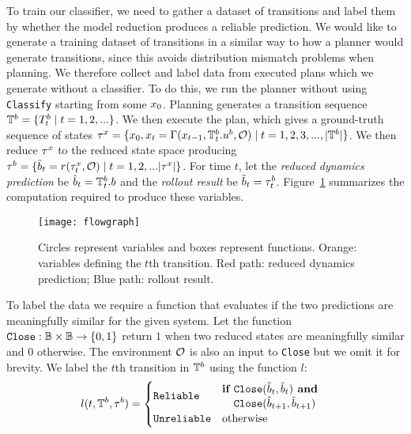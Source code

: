 To train our classifier, we need to gather a dataset of transitions and label them by whether the model reduction produces a reliable prediction. We would like to generate a training dataset of transitions in a similar way to how a planner would generate transitions, since this avoids distribution mismatch problems when planning. We therefore collect and label data from executed plans which we generate without a classifier. To do this, we run the planner without using \texttt{Classify} starting from some $x_0$. Planning generates a transition sequence $\mathbb{T}^b = \{T_t^b \mid t=1,2,...\}$. We then execute the plan, which gives a ground-truth sequence of states $\tau^x = \{x_0, x_t = \Gamma(x_{t-1},\mathbb{T}^b_t.u^b,\mathcal{O}) \mid t=1,2,3,...,|\mathbb{T}^b|\}$. We then reduce $\tau^x$ to the reduced state space producing $\tau^b = \{\tilde{b}_t=r(\tau^x_t,\mathcal{O}) \mid t=1,2,...|\tau^x|\}$. For time $t$, let the \textit{reduced dynamics prediction} be $\hat{b}_t = \mathbb{T}^b_t.b$ and the \textit{rollout result} be $\tilde{b}_t = \tau^b_t$. Figure~\ref{fig:flowgraph} summarizes the computation required to produce these variables.

\begin{figure}[h]
    \centering
    \texttt{[image: flowgraph]}
    \caption{Circles represent variables and boxes represent functions. Orange: variables defining the $t$th transition. Red path: reduced dynamics prediction; Blue path: rollout result.}
    \label{fig:flowgraph}
\end{figure}

To label the data we require a function that evaluates if the two predictions are meaningfully similar for the given system. Let the function $\texttt{Close}:\mathcal{\mathbb{B}} \times \mathbb{B} \rightarrow \{0,1\}$ return $1$ when two reduced states are meaningfully similar and $0$ otherwise. The environment $\mathcal{O}$ is also an input to \texttt{Close} but we omit it for brevity. We label the $t$th transition in $\mathbb{T}^b$ using the function $l$:
\begin{equation}
    \begin{aligned}
    l(t,\mathbb{T}^b,\tau^b) &= \begin{cases} 
        \texttt{Reliable}   &  \begin{aligned}\textbf{if } & \texttt{Close}(\hat{b}_t, \tilde{b}_t) \textbf{ and} \\ 
                                                           & \texttt{Close}(\hat{b}_{t+1}, \tilde{b}_{t+1})\end{aligned} \\
        \texttt{Unreliable} & \mbox{otherwise} \end{cases}
    \end{aligned}
    \label{eqn:labeling}
\end{equation}

